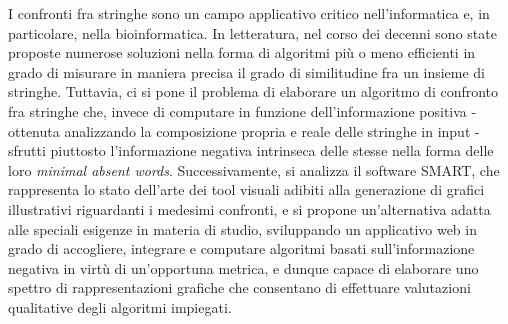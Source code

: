 I confronti fra stringhe sono un campo applicativo critico nell'informatica e, in particolare, nella bioinformatica. In letteratura, nel corso dei decenni sono state proposte numerose soluzioni nella forma di algoritmi più o meno efficienti in grado di misurare in maniera precisa il grado di similitudine fra un insieme di stringhe. Tuttavia, ci si pone il problema di elaborare un algoritmo di confronto fra stringhe che, invece di computare in funzione dell'informazione positiva - ottenuta analizzando la composizione propria e reale delle stringhe in input - sfrutti piuttosto l'informazione negativa intrinseca delle stesse nella forma delle loro \textit{minimal absent words}. Successivamente, si analizza il software SMART, che rappresenta lo stato dell'arte dei tool visuali adibiti alla generazione di grafici illustrativi riguardanti i medesimi confronti, e si propone un'alternativa adatta alle speciali esigenze in materia di studio, sviluppando un applicativo web in grado di accogliere, integrare e computare algoritmi basati sull'informazione negativa in virtù di un'opportuna metrica, e dunque capace di elaborare uno spettro di rappresentazioni grafiche che consentano di effettuare valutazioni qualitative degli algoritmi impiegati.